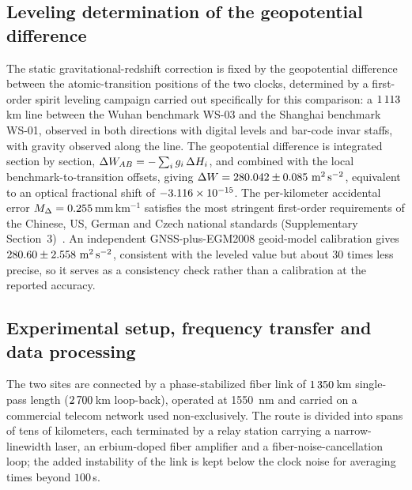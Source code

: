 \subsection*{Leveling determination of the geopotential difference}

The static gravitational-redshift correction is fixed by the
geopotential difference between the atomic-transition positions of the
two clocks, determined by a first-order spirit leveling campaign
carried out specifically for this comparison: a
$1\thinspace113$\,km line between the Wuhan benchmark WS-03 and the
Shanghai benchmark WS-01, observed in both directions with digital
levels and bar-code invar staffs, with gravity observed along the
line. The geopotential difference is integrated section by section,
$\Delta W_{AB} = -\sum_i g_i\,\Delta H_i$, and combined with the local
benchmark-to-transition offsets, giving
$\Delta W = 280.042 \pm 0.085~\mathrm{m^2\,s^{-2}}$, equivalent to an
optical fractional shift of $-3.116\times10^{-15}$. The per-kilometer accidental
error $M_\Delta = 0.255$\,mm\,km$^{-1}$ satisfies the most
stringent first-order requirements of the Chinese, US, German and
Czech national standards (Supplementary
Section~3)~\citep{fgcc1984,gb12897,cuzk2015,advfapn2022}. An
independent GNSS-plus-EGM2008 geoid-model calibration gives
$280.60 \pm 2.558~\mathrm{m^2\,s^{-2}}$, consistent with the
leveled value but about 30 times less precise, so it serves as a
consistency check rather than a calibration at the reported
accuracy.

\subsection*{Experimental setup, frequency transfer and data processing}

The two sites are connected by a phase-stabilized fiber link of
$1\thinspace350$\,km single-pass length ($2\thinspace700$\,km loop-back),
operated at \qty{1550}{nm} and carried on a commercial telecom
network used non-exclusively. The route is divided into spans of tens
of kilometers, each terminated by a relay station carrying a
narrow-linewidth laser, an erbium-doped fiber amplifier and a
fiber-noise-cancellation loop; the added instability of the link is
kept below the clock noise for averaging times beyond $100$\,s.

